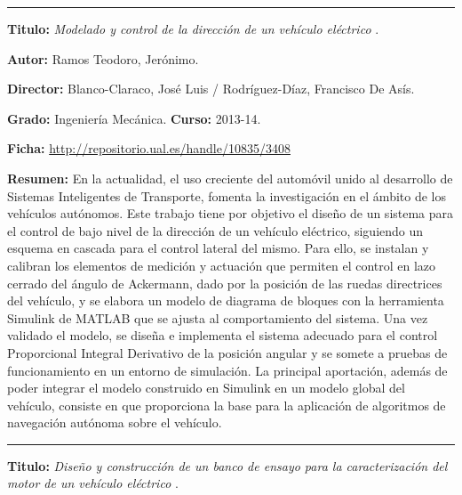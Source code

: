\vspace{6pt} \hrule \vspace{6pt}
 
 \textbf{Titulo:} \textit{Modelado y control de la dirección de un vehículo eléctrico} \cite{ramos2014direccion}.

\textbf{Autor:} Ramos Teodoro, Jerónimo.

\textbf{Director:} Blanco-Claraco, José Luis / Rodríguez-Díaz, Francisco De Asís.

\textbf{Grado:} Ingeniería Mecánica. \textbf{Curso:} 2013-14. 

\textbf{Ficha:} \url{http://repositorio.ual.es/handle/10835/3408}
 
\textbf{Resumen:} En la actualidad, el uso creciente del automóvil unido al desarrollo de Sistemas Inteligentes de Transporte, fomenta la investigación en el ámbito de los vehículos autónomos. Este trabajo tiene por objetivo el diseño de un sistema para el control de bajo nivel de la dirección de un vehículo eléctrico, siguiendo un esquema en cascada para el control lateral del mismo. Para ello, se instalan y calibran los elementos de medición y actuación que permiten el control en lazo cerrado del ángulo de Ackermann, dado por la posición de las ruedas directrices del vehículo, y se elabora un modelo de diagrama de bloques con la herramienta Simulink de MATLAB que se ajusta al comportamiento del sistema. Una vez validado el modelo, se diseña e implementa el sistema adecuado para el control Proporcional Integral Derivativo de la posición angular y se somete a pruebas de funcionamiento en un entorno de simulación. La principal aportación, además de poder integrar el modelo construido en Simulink en un modelo global del vehículo, consiste en que proporciona la base para la aplicación de algoritmos de navegación autónoma sobre el vehículo.

\vspace{6pt} \hrule \vspace{6pt}

\textbf{Titulo:} \textit{Diseño y construcción de un banco de ensayo para la caracterización del motor de un vehículo eléctrico} \cite{acuna2014motor}.

